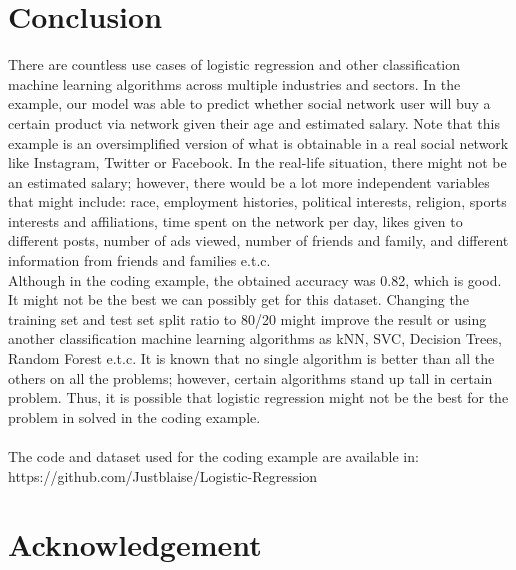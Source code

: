 \documentclass[conference]{IEEEtran}
\begin{document}
\section{Conclusion}
There are countless use cases of logistic regression and other classification machine learning algorithms across multiple industries and sectors. In the example, our model was able to predict whether social network user will buy a certain product via network given their age and estimated salary. Note that this example is an oversimplified version of what is obtainable in a real social network like Instagram, Twitter  or Facebook. In the real-life situation, there might not be an estimated salary; however, there would be a lot more independent variables that might include: race, employment histories, political interests, religion, sports interests and affiliations, time spent on the network per day, likes given to different posts, number of ads viewed, number of friends and family, and different information from friends and families e.t.c.\\
Although in the coding example, the obtained accuracy was 0.82, which is good. It might not be the best we can possibly get for this dataset. Changing the training set and test set split ratio to 80/20 might improve the result or using another classification machine learning algorithms as kNN, SVC, Decision Trees, Random Forest e.t.c. It is known that no single algorithm is better than all the others on all the problems; however, certain algorithms stand up tall in certain problem\cite{bb6}. Thus, it is possible that logistic regression might not be the best for the problem in solved in the coding example.\\
\\
The code and dataset used for the coding example are available in:
https://github.com/Justblaise/Logistic-Regression

\section*{Acknowledgement}











\end{document}
